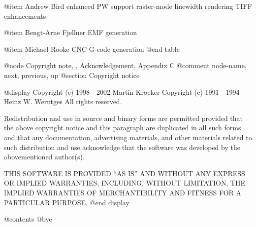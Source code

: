 @item Andrew Bird
enhanced PW support
raster-mode linewidth rendering
TIFF enhancements

@item Bengt-Arne Fjellner
EMF generation

@item Michael Rooke
CNC G-code generation
@end table



@node Copyright note, , Acknowledgement, Appendix C
@comment  node-name,  next,  previous,  up
@section Copyright notice

@display
Copyright (c) 1998 - 2002  Martin Kroeker
Copyright (c) 1991 - 1994  Heinz W. Werntges
All rights reserved.

Redistribution and use in source and binary forms are permitted provided that
the above copyright notice and this paragraph are duplicated in all such forms
and that any documentation, advertising materials, and other materials related
to such distribution and use acknowledge that the software was developed
by the abovementioned author(s).

THIS SOFTWARE IS PROVIDED ``AS IS'' AND WITHOUT ANY EXPRESS
OR IMPLIED WARRANTIES, INCLUDING, WITHOUT LIMITATION,
THE IMPLIED WARRANTIES OF MERCHANTIBILITY AND FITNESS
FOR A PARTICULAR PURPOSE.
@end display

@contents
@bye

